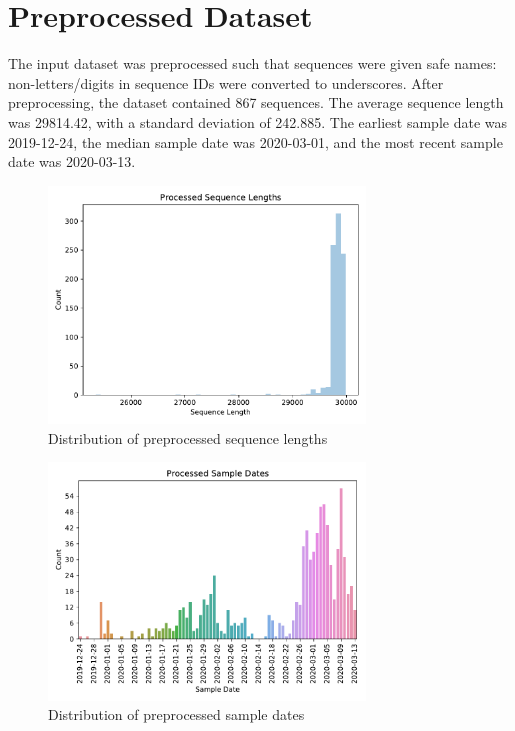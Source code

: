 \documentclass{article}
\begin{document}
\section{Preprocessed Dataset}
The input dataset was preprocessed such that sequences were given safe names: non-letters/digits in sequence IDs were converted to underscores. After preprocessing, the dataset contained 867 sequences. The average sequence length was 29814.42, with a standard deviation of 242.885. The earliest sample date was 2019-12-24, the median sample date was 2020-03-01, and the most recent sample date was 2020-03-13.

\begin{figure}[h]
\centering
\includegraphics[width=0.75\textwidth,keepaspectratio]{./figs/processed_sequence_lengths.pdf}
\caption{Distribution of preprocessed sequence lengths}
\end{figure}



\begin{figure}[h]
\centering
\includegraphics[width=0.75\textwidth,keepaspectratio]{./figs/processed_sample_dates.pdf}
\caption{Distribution of preprocessed sample dates}
\end{figure}
\end{document}
